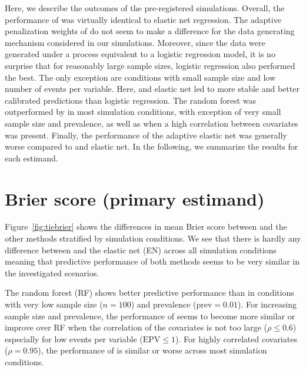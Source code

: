 \documentclass[a4paper, 11pt]{article}
\title{
  \vspace{-2em}
  \textbf{\longtitle} \\
  \subtitle
}
\author{
  \textbf{\longauthors} \\
  \affiliation \\
  \small\{samuel.pawel, lucasheinrich.kook, kelly.reeve\}@uzh.ch
}
\date{} %
\begin{document}
\maketitle

Here, we describe the outcomes of the pre-registered simulations.
Overall, the performance of \ainet{} was virtually identical to elastic net
regression. The adaptive penalization weights of \ainet{} do not seem to make a
difference for the data generating mechanism considered in our simulations.
Moreover, since the data were generated under a process equivalent to a logistic
regression model, it is no surprise that for reasonably large sample sizes,
logistic regression also performed the best. The only exception are
conditions with small sample size and low number of events per variable. Here,
\ainet{} and elastic net led to more stable and better calibrated predictions
than logistic regression. The random forest was outperformed by \ainet{} in most
simulation conditions, with exception of very small sample size and prevalence,
as well as when a high correlation between covariates was present. Finally, the
performance of the adaptive elastic net was generally worse compared to
\ainet{} and elastic net. In the following, we summarize the results for each
estimand.

\section{Brier score (primary estimand)}
Figure~\ref{fig:tiebrier} shows the differences in mean Brier score between
\ainet{} and the other methods stratified by simulation conditions.
We see that there is hardly any difference between \ainet{} and the elastic net (EN)
across all simulation conditions meaning that predictive performance of both
methods seems to be very similar in the investigated scenarios.

The random forest (RF) shows better predictive performance than \ainet{} in
conditions with very low sample size ($n = 100$) and prevalence
($\mbox{prev} = 0.01$). For increasing sample size and prevalence, the
performance of \ainet{} seems to become more similar or improve over RF when the
correlation of the covariates is not too large ($\rho \leq 0.6$) especially for
low events per variable ($\mbox{EPV} \leq 1$). For highly correlated covariates
($\rho = 0.95$), the performance of \ainet{} is similar or worse across most
simulation conditions.
\end{document}
